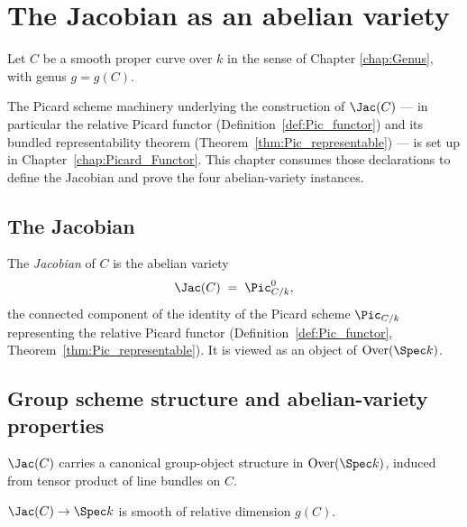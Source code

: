 \chapter{The Jacobian as an abelian variety}
\label{chap:Jacobian}

Let $C$ be a smooth proper curve over $k$ in the sense of Chapter \ref{chap:Genus}, with genus $g = g(C)$.

The Picard scheme machinery underlying the construction of $\Jac(C)$ — in particular the relative Picard functor (Definition~\ref{def:Pic_functor}) and its bundled representability theorem (Theorem~\ref{thm:Pic_representable}) — is set up in Chapter~\ref{chap:Picard_Functor}. This chapter consumes those declarations to define the Jacobian and prove the four abelian-variety instances.

\section{The Jacobian}

\begin{definition}[Jacobian]
  \label{def:Jacobian}
  \leanok
  The \emph{Jacobian} of $C$ is the abelian variety
  \[
    \Jac(C) \;=\; \Pic^0_{C/k},
  \]
  the connected component of the identity of the Picard scheme $\Pic_{C/k}$ representing the relative Picard functor (Definition~\ref{def:Pic_functor}, Theorem~\ref{thm:Pic_representable}). It is viewed as an object of $\textrm{Over}(\Spec k)$.
\end{definition}

\section{Group scheme structure and abelian-variety properties}

\begin{theorem}
  \label{thm:Jacobian_grpObj}
  \leanok
  $\Jac(C)$ carries a canonical group-object structure in $\textrm{Over}(\Spec k)$, induced from tensor product of line bundles on $C$.
\end{theorem}

\begin{theorem}
  \label{thm:Jacobian_smooth_genus}
  \leanok
  $\Jac(C) \to \Spec k$ is smooth of relative dimension $g(C)$.
\end{theorem}

